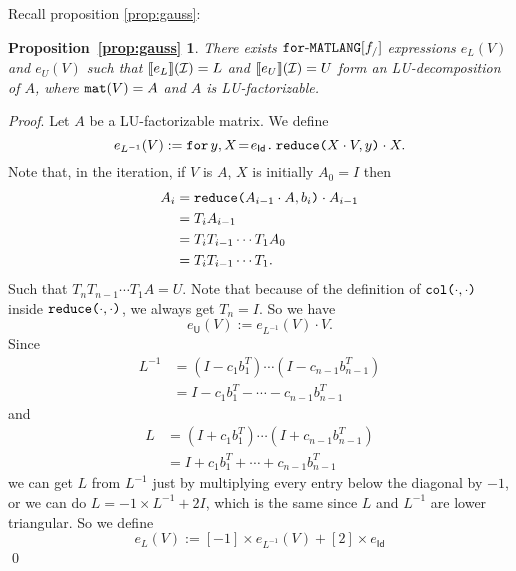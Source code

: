 \newtheorem*{ALU}{Proposition~\ref{prop:gauss}}

Recall proposition \ref{prop:gauss}:

\begin{ALU}
  There exists $\langforf{f_/}$ expressions $e_L(V)$ and $e_U(V)$ such that
  $\sem{e_L}{\I}=L$ and $\sem{e_U}{\I}=U$ form an LU-decomposition of $A$,
  where $\conc(V)=A$ and $A$ is LU-factorizable.
\end{ALU}

\textit{Proof}. Let $A$ be a LU-factorizable matrix. We define
$$
e_{L^{-1}}(V) :=  \initf{e_{\mathsf{Id}}}{y}{X}{\red{X\cdot V}{y}\cdot X}.
$$
Note that, in the iteration, if $V$ is $A$, $X$ is initially $A_0=I$ then
\begin{align*}
  A_i&=\red{A_{i-1}\cdot A}{b_i}\cdot A_{i-1} \\
  &=T_iA_{i-1} \\
  &=T_iT_{i-1}\cdots T_1A_0 \\
  &=T_iT_{i-1}\cdots T_1.
\end{align*}
Such that $T_nT_{n-1}\cdots T_1A=U$. Note that because of the definition of $\ccol{\cdot}{\cdot}$ inside $\red{\cdot}{\cdot}$, we always get $T_n=I$.
So we have
$$
e_{\mathsf{U}}(V) :=  e_{L^{-1}}(V) \cdot V.
$$
Since
\begin{align*}
  L^{-1}&=(I-c_1b_1^T)\cdots (I-c_{n-1}b_{n-1}^T) \\
  &=I-c_1b_1^T-\cdots - c_{n-1}b_{n-1}^T
\end{align*}
and
\begin{align*}
  L&=(I+c_1b_1^T)\cdots (I+c_{n-1}b_{n-1}^T) \\
  &=I+c_1b_1^T+\cdots + c_{n-1}b_{n-1}^T
\end{align*}
we can get $L$ from $L^{-1}$ just by multiplying every entry below the diagonal by $-1$, or we can do $L=-1\times L^{-1} + 2I$, which is the same since $L$ and $L^{-1}$ are lower triangular. So we define
$$
e_{L}(V) :=  [-1]\times e_{L^{-1}}(V) + [2]\times e_{\mathsf{Id}}
$$
\qed